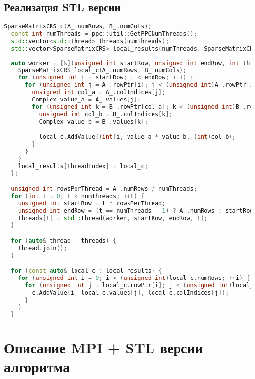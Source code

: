 \documentclass[14pt,a4paper]{extarticle}
\begin{document}
\subsection*{Реализация STL версии}
\begin{lstlisting}[language=C++]
  SparseMatrixCRS c(A_.numRows, B_.numCols);
  const int numThreads = ppc::util::GetPPCNumThreads();
  std::vector<std::thread> threads(numThreads);
  std::vector<SparseMatrixCRS> local_results(numThreads, SparseMatrixCRS(A_.numRows, B_.numCols));
 
  auto worker = [&](unsigned int startRow, unsigned int endRow, int threadIndex) {
    SparseMatrixCRS local_c(A_.numRows, B_.numCols);
    for (unsigned int i = startRow; i < endRow; ++i) {
      for (unsigned int j = A_.rowPtr[i]; j < (unsigned int)A_.rowPtr[i + 1]; ++j) {
        unsigned int col_a = A_.colIndices[j];
        Complex value_a = A_.values[j];
        for (unsigned int k = B_.rowPtr[col_a]; k < (unsigned int)B_.rowPtr[col_a + 1]; ++k) {
          unsigned int col_b = B_.colIndices[k];
          Complex value_b = B_.values[k];

          local_c.AddValue((int)i, value_a * value_b, (int)col_b);
        }
      }
    }
    local_results[threadIndex] = local_c;
  };

  unsigned int rowsPerThread = A_.numRows / numThreads;
  for (int t = 0; t < numThreads; ++t) {
    unsigned int startRow = t * rowsPerThread;
    unsigned int endRow = (t == numThreads - 1) ? A_.numRows : startRow + rowsPerThread;
    threads[t] = std::thread(worker, startRow, endRow, t);
  }

  for (auto& thread : threads) {
    thread.join();
  }

  for (const auto& local_c : local_results) {
    for (unsigned int i = 0; i < (unsigned int)local_c.numRows; ++i) {
      for (unsigned int j = local_c.rowPtr[i]; j < (unsigned int)local_c.rowPtr[i + 1]; ++j) {
        c.AddValue(i, local_c.values[j], local_c.colIndices[j]);
      }
    }
  }
\end{lstlisting}

\section{Описание MPI + STL версии алгоритма}
\end{document}
